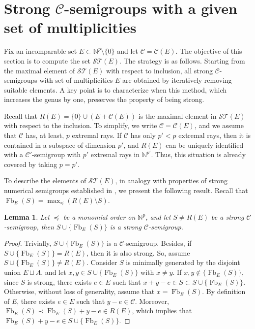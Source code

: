 \documentclass[a4paper,11pt]{article}
\newtheorem{lemma}[theorem]{Lemma}
\def\CaC{\mathcal{C}}
\def\N{\mathbb{N}}
\def\Fb{\operatorname{Fb}}
\begin{document}
{\section{Strong $\CaC$-semigroups with a given set of multiplicities}\label{sec:ST}
Fix an incomparable set $E\subset \N^p\setminus\{0\}$ and let $\CaC=\CaC(E)$.
The objective of this section is to compute the set $\mathcal{ST}(E)$.
The strategy is as follows. Starting from the maximal element of $\mathcal{ST}(E)$ with respect to inclusion, all strong $\CaC$-semigroups with set of multiplicities $E$ are obtained by iteratively removing suitable elements. A key point is to characterize when this method,  which increases the genus by one, preserves the property of being strong.

Recall that $R(E)=\{0\}\cup (E + \CaC(E))$ is the maximal element in $\mathcal{ST}(E)$ with respect to the inclusion. To simplify, we write $\CaC=\CaC(E)$, and we assume that $\CaC$ has, at least, $p$ extremal rays. If $\CaC$ has only $p' < p $ extremal rays, then it is contained in a subspace of dimension $p'$, and $R(E)$ can be uniquely identified with a $\CaC'$-semigroup with $p'$ extremal rays in
$\mathbb{N}^{p'}$. Thus, this situation is already covered by taking $p = p'$.

To describe the elements of $\mathcal{ST}(E)$, in analogy with properties of strong numerical semigroups established in \cite{RoblesRosalesModularFrob}, we present the following result. Recall that $\Fb_E(S)=\max_\preceq(R(E)\setminus S)$.

\begin{lemma}\label{strongUnionFrob}
Let $\preceq$ be a monomial order on $\N^p$, and let $S\neq R(E)$ be a strong $\CaC$-semigroup, then $S \cup \{\Fb_E(S)\}$ is a strong $\CaC$-semigroup.
\end{lemma}

\begin{proof}
Trivially, $S \cup \{\Fb_E(S)\}$ is a $\CaC$-semigroup. Besides, if $S \cup \{\Fb_E(S)\}=R(E)$, then it is also strong. So, assume $S \cup \{\Fb_E(S)\}\neq R(E)$. Consider $S$ is minimally generated by the disjoint union $E\sqcup A$, and let $x,y\in S \cup \{\Fb_E(S)\}$ with $x\neq y$.
If $x,y\notin\{\Fb_E(S)\}$, since $S$ is strong, there exists  $e\in E$ such that $x+y-e\in S\subset S\cup \{\Fb_E(S)\}$.
Otherwise, without loss of generality, assume that $x=\Fb_E(S)$. By definition of $E$, there exists $e\in E$ such that $y-e\in \CaC$.
Moreover, $\Fb_E(S)\prec \Fb_E(S) +y -e\in R(E)$, which implies that $\Fb_E(S) +y -e\in S\cup \{\Fb_E(S)\}$.
\end{proof}

}
\end{document}
